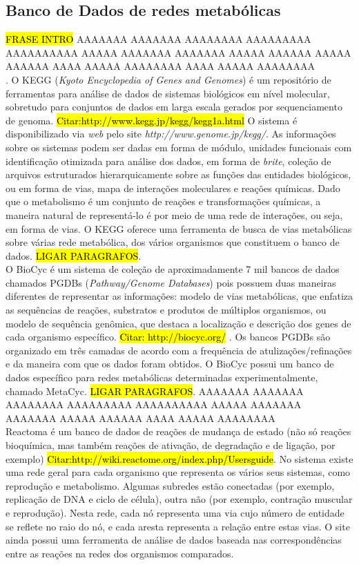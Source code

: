 \documentclass[conference]{IEEEtran}
\begin{document}
\subsection{Banco de Dados de redes metabólicas}


\hl{FRASE INTRO} \indent AAAAAAA AAAAAAA  AAAAAAAA AAAAAAAAA AAAAAAAAAA AAAAA AAAAAAA AAAAAAA AAAAA AAAAAA AAAAA AAAAAA AAAA AAAAA AAAAAAAA AAAA AAAAA AAAAAAAA \\. O KEGG (\textit{Kyoto Encyclopedia of Genes and Genomes}) é um repositório de ferramentas para análise de dados de sistemas biológicos em nível molecular, sobretudo para conjuntos de dados em larga escala gerados por sequenciamento de genoma. \hl{Citar:http://www.kegg.jp/kegg/kegg1a.html} O sistema é disponibilizado via \textit{web} pelo site \textit{http://www.genome.jp/kegg/}. As informações sobre os sistemas podem ser dadas em forma de módulo, unidades funcionais com identificação otimizada para análise dos dados, em forma de \textit{brite}, coleção de arquivos estruturados hierarquicamente sobre as funções das entidades biológicos, ou em forma de vias, mapa de interações moleculares e reações químicas. Dado que o metabolismo é um conjunto de reações e transformações químicas, a maneira natural de representá-lo é por meio de uma rede de interações, ou seja, em forma de vias. O KEGG oferece uma ferramenta de busca de vias metabólicas sobre várias rede metabólica, dos vários organismos que constituem o banco de dados. \hl{LIGAR PARAGRAFOS}.\\
\indent O BioCyc é um sistema de coleção de aproximadamente 7 mil bancos de dados chamados PGDBs (\textit{Pathway/Genome Databases}) pois possuem duas maneiras diferentes de representar as informações: modelo de vias metabólicas, que enfatiza as sequências de reações, substratos e produtos de múltiplos organismos, ou modelo de sequência genômica, que destaca a localização e descrição dos genes de cada organismo específico. \hl{Citar: http://biocyc.org/} . Os bancos PGDBs são organizado em três camadas de acordo com a frequência de atulizações/refinações e da maneira com que os dados foram obtidos. O BioCyc possui um banco de dados específico para redes metabólicas determinadas experimentalmente, chamado MetaCyc. \hl{LIGAR PARAGRAFOS}. AAAAAAA AAAAAAA  AAAAAAAA AAAAAAAAA AAAAAAAAAA AAAAA AAAAAAA AAAAAAA AAAAA AAAAAA AAAA AAAAA AAAAAAAA \\
\indent Reactoma é um banco de dados de reações de mudança de estado (não só reações bioquímica, mas também reações de ativação, de degradação e de ligação, por exemplo) \hl{Citar:http://wiki.reactome.org/index.php/Usersguide}. No sistema existe uma rede geral para cada organismo que representa os vários seus sistemas, como reprodução e metabolismo. Algumas subredes estão conectadas (por exemplo, replicação de DNA e ciclo de célula), outra não (por exemplo, contração muscular e reprodução). Nesta rede, cada nó representa uma via cujo número de entidade se reflete no raio do nó, e cada aresta representa a relação entre estas vias. O site ainda possui uma ferramenta de análise de dados baseada nas correspondências entre as reações na redes dos organismos comparados. \\
\end{document}
